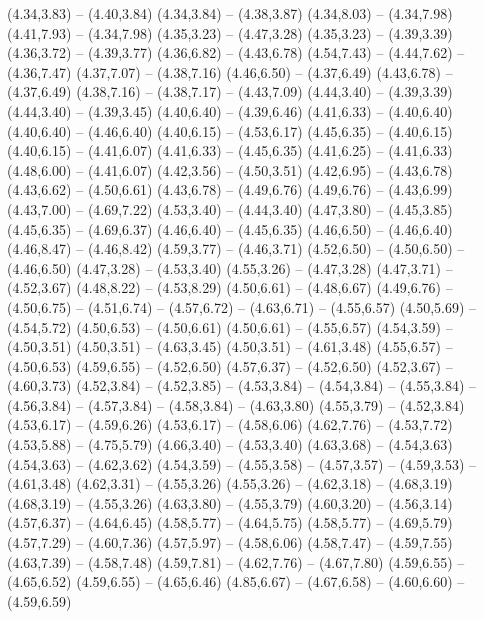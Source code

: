 {  (4.34,3.83) -- (4.40,3.84)
  (4.34,3.84) -- (4.38,3.87)
  (4.34,8.03) -- (4.34,7.98)
  (4.41,7.93) -- (4.34,7.98)
  (4.35,3.23) -- (4.47,3.28)
  (4.35,3.23) -- (4.39,3.39)
  (4.36,3.72) -- (4.39,3.77)
  (4.36,6.82) -- (4.43,6.78)
  (4.54,7.43) -- (4.44,7.62) -- (4.36,7.47)
  (4.37,7.07) -- (4.38,7.16)
  (4.46,6.50) -- (4.37,6.49)
  (4.43,6.78) -- (4.37,6.49)
  (4.38,7.16) -- (4.38,7.17) -- (4.43,7.09)
  (4.44,3.40) -- (4.39,3.39)
  (4.44,3.40) -- (4.39,3.45)
  (4.40,6.40) -- (4.39,6.46)
  (4.41,6.33) -- (4.40,6.40)
  (4.40,6.40) -- (4.46,6.40)
  (4.40,6.15) -- (4.53,6.17)
  (4.45,6.35) -- (4.40,6.15)
  (4.40,6.15) -- (4.41,6.07)
  (4.41,6.33) -- (4.45,6.35)
  (4.41,6.25) -- (4.41,6.33)
  (4.48,6.00) -- (4.41,6.07)
  (4.42,3.56) -- (4.50,3.51)
  (4.42,6.95) -- (4.43,6.78)
  (4.43,6.62) -- (4.50,6.61)
  (4.43,6.78) -- (4.49,6.76)
  (4.49,6.76) -- (4.43,6.99)
  (4.43,7.00) -- (4.69,7.22)
  (4.53,3.40) -- (4.44,3.40)
  (4.47,3.80) -- (4.45,3.85)
  (4.45,6.35) -- (4.69,6.37)
  (4.46,6.40) -- (4.45,6.35)
  (4.46,6.50) -- (4.46,6.40)
  (4.46,8.47) -- (4.46,8.42)
  (4.59,3.77) -- (4.46,3.71)
  (4.52,6.50) -- (4.50,6.50) -- (4.46,6.50)
  (4.47,3.28) -- (4.53,3.40)
  (4.55,3.26) -- (4.47,3.28)
  (4.47,3.71) -- (4.52,3.67)
  (4.48,8.22) -- (4.53,8.29)
  (4.50,6.61) -- (4.48,6.67)
  (4.49,6.76) -- (4.50,6.75) -- (4.51,6.74) -- (4.57,6.72) -- (4.63,6.71) -- (4.55,6.57)
  (4.50,5.69) -- (4.54,5.72)
  (4.50,6.53) -- (4.50,6.61)
  (4.50,6.61) -- (4.55,6.57)
  (4.54,3.59) -- (4.50,3.51)
  (4.50,3.51) -- (4.63,3.45)
  (4.50,3.51) -- (4.61,3.48)
  (4.55,6.57) -- (4.50,6.53)
  (4.59,6.55) -- (4.52,6.50)
  (4.57,6.37) -- (4.52,6.50)
  (4.52,3.67) -- (4.60,3.73)
  (4.52,3.84) -- (4.52,3.85) -- (4.53,3.84) -- (4.54,3.84) -- (4.55,3.84) -- (4.56,3.84) -- (4.57,3.84) -- (4.58,3.84) -- (4.63,3.80)
  (4.55,3.79) -- (4.52,3.84)
  (4.53,6.17) -- (4.59,6.26)
  (4.53,6.17) -- (4.58,6.06)
  (4.62,7.76) -- (4.53,7.72)
  (4.53,5.88) -- (4.75,5.79)
  (4.66,3.40) -- (4.53,3.40)
  (4.63,3.68) -- (4.54,3.63)
  (4.54,3.63) -- (4.62,3.62)
  (4.54,3.59) -- (4.55,3.58) -- (4.57,3.57) -- (4.59,3.53) -- (4.61,3.48)
  (4.62,3.31) -- (4.55,3.26)
  (4.55,3.26) -- (4.62,3.18) -- (4.68,3.19)
  (4.68,3.19) -- (4.55,3.26)
  (4.63,3.80) -- (4.55,3.79)
  (4.60,3.20) -- (4.56,3.14)
  (4.57,6.37) -- (4.64,6.45)
  (4.58,5.77) -- (4.64,5.75)
  (4.58,5.77) -- (4.69,5.79)
  (4.57,7.29) -- (4.60,7.36)
  (4.57,5.97) -- (4.58,6.06)
  (4.58,7.47) -- (4.59,7.55)
  (4.63,7.39) -- (4.58,7.48)
  (4.59,7.81) -- (4.62,7.76) -- (4.67,7.80)
  (4.59,6.55) -- (4.65,6.52)
  (4.59,6.55) -- (4.65,6.46)
  (4.85,6.67) -- (4.67,6.58) -- (4.60,6.60) -- (4.59,6.59)
}
